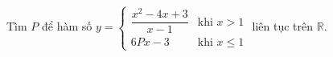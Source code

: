 \begin{ex}
Tìm $P$ để hàm số $y=\begin{cases}\dfrac{x^2-4x+3}{x-1}&\text{khi }x>1\\6Px-3&\text{khi }x\le1\end{cases}$ liên tục trên $\mathbb R$.
\end{ex}
